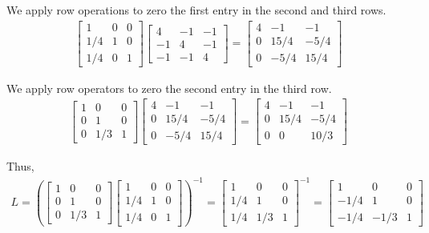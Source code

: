 \documentclass[10pt]{article}
\begin{document}
\begin{solution}[Solution]
We apply row operations to zero the first entry in the second and third rows.
\begin{align*}
\left[ \begin{array}{rrr} 1 & 0 & 0 \\ 1/4 & 1 & 0 \\ 1/4 & 0 & 1 \end{array} \right] 
\left[ \begin{array}{rrr} 4 & -1 & -1 \\ -1 & 4 & -1 \\ -1 & -1 & 4 \end{array} \right]  = 
\left[ \begin{array}{rrr} 4 & -1 & -1 \\ 0 & 15/4 & -5/4 \\ 0 & -5/4 & 15/4 \end{array} \right] 
\end{align*}

We apply row operators to zero the second entry in the third row.
\begin{align*}
\left[ \begin{array}{rrr} 1 & 0 & 0 \\ 0 & 1 & 0 \\ 0 & 1/3 & 1 \end{array} \right] 
\left[ \begin{array}{rrr} 4 & -1 & -1 \\ 0 & 15/4 & -5/4 \\ 0 & -5/4 & 15/4 \end{array} \right] =
\left[ \begin{array}{rrr} 4 & -1 & -1 \\ 0 & 15/4 & -5/4 \\ 0 & 0 & 10/3 \end{array} \right]
\end{align*}

Thus,
\begin{align*}
    L =
    \left(
    \left[ \begin{array}{rrr} 1 & 0 & 0 \\ 0 & 1 & 0 \\ 0 & 1/3 & 1 \end{array} \right] 
    \left[ \begin{array}{rrr} 1 & 0 & 0 \\ 1/4 & 1 & 0 \\ 1/4 & 0 & 1 \end{array} \right]
        \right)^{-1} =
    \left[ \begin{array}{rrr} 1 & 0 & 0 \\ 1/4 & 1 & 0 \\ 1/4 & 1/3 & 1 \end{array} \right]^{-1} = 
        \left[\begin{array}{rrr} 1 & 0 & 0 \\ -1/4 & 1 & 0 \\ -1/4 & -1/3 & 1  \end{array}\right]
\end{align*}


\end{solution}
\end{document}

